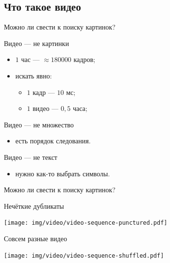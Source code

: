 
\subsection{Что такое видео}

\begin{frame}{Можно ли свести к поиску картинок?}
    \begin{orange-box}{Видео — не картинки}
        \begin{itemize}
            \item $1$ час — $\approx 180 000$  кадров;
            \item искать явно:
            \begin{itemize}
                \item $1$ кадр — $10$ мс;
                \item $1$ видео — $0,5$ часа;
            \end{itemize}
        \end{itemize}
    \end{orange-box}
    \vspace{1em}
    \begin{blue-box}{Видео — не множество}
        \begin{itemize}
            \item есть порядок следования.
        \end{itemize}
    \end{blue-box}
    \vspace{1em}
    \begin{gray-box}{Видео — не текст}
        \begin{itemize}
            \item нужно как-то выбрать символы.
        \end{itemize}
    \end{gray-box}
\end{frame}

\begin{frame}{Можно ли свести к поиску картинок?}
    \begin{grass-green-box}{Нечёткие дубликаты}
        \begin{center}
            \texttt{[image: img/video/video-sequence-punctured.pdf]}
        \end{center}
    \end{grass-green-box}
    \vspace{1.5em}
    \begin{orange-box}{Совсем разные видео}
        \begin{center}
            \texttt{[image: img/video/video-sequence-shuffled.pdf]}
        \end{center}
    \end{orange-box}
\end{frame}


